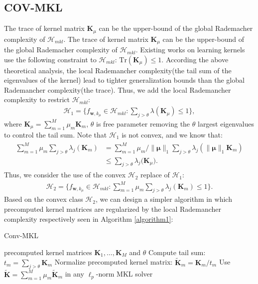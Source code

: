 \documentclass{article}
\begin{document}
\subsection{COV-MKL}
The trace of kernel matrix $\mathbf{K}_\mu$ can be the upper-bound of the global Rademacher complexity of $\mathcal{H}_{mkl}$.
The trace of kernel matrix $\mathbf{K}_\mu$ can be the upper-bound of the global Rademacher complexity of $\mathcal{H}_{mkl}$. Existing works on learning kernels \cite{LanckrietCBGJ02,BachLJ04,SonnenburgRSS06} use the following constraint to $\mathcal{H}_{mkl}$:
$\mathrm{Tr}(\mathbf{K}_\mu) \leq 1.$
According the above theoretical analysis, the local Rademancher complexity(the tail sum of the eigenvalues of the kernel) lead to tighter generalization bounds than the global Rademancher complexity(the trace). Thus, we add the local Rademancher complexity to restrict $\mathcal{H}_{mkl}$:
\begin{align}
    \mathcal{H}_{1}=\Big\{f_{\mathbf{w}, k_\mu} \in \mathcal{H}_{mkl}:\sum_{j > \theta} \lambda(\mathbf{K}_\mu) \leq 1\Big\},
\end{align}
where $\mathbf{K}_\mu=\sum_{m=1}^M \mu_m \mathbf{K}_m$,
$\theta$ is free parameter removing the $\theta$ largest eigenvalues to control the tail sum.
Note that $\mathcal{H}_{1}$ is not convex, and we know that:
\begin{align*}
    \begin{aligned}
        \sum_{m=1}^M\mu_m\sum_{j>\theta}\lambda_{j}(\mathbf{K}_m) & =\sum_{m=1}^M\mu_m/\|\mathbf{\mu}\|_1 \sum_{j>\theta}\lambda_{j}(\|\mathbf{\mu}\|_1\mathbf{K}_m)\\
        & \leq \sum_{j>\theta} \lambda_j\big(\mathbf{K}_\mu\big).
    \end{aligned}
\end{align*}
Thus, we consider the use of the convex $\mathcal{H}_2$ replace of $\mathcal{H}_1$:
\begin{align}
    \mathcal{H}_{2}=\Big\{f_{\mathbf{w}, k_\mu} \in \mathcal{H}_{mkl}:
    \sum_{m=1}^M\mu_m\sum_{j>\theta}\lambda_{j}(\mathbf{K}_m) \leq 1\Big\}.
\end{align}
Based on the convex class $\mathcal{H}_2$, we can design a simpler algorithm in which precomputed kernel matrices
are regularized by the local Rademancher complexity respectively seen in Algorithm  \ref{algorithm1}:
\begin{algorithm}[h]
   \caption{Conv-MKL}
   \label{algorithm1}
    \begin{algorithmic}
        precomputed kernel matrices $\mathbf{K}_1,\ldots,\mathbf{K}_M$ and $\theta$
        \STATE Compute tail sum: $t_m=\sum_{j>\theta}\mathbf{K}_m$
        \STATE Normalize precomputed kernel matrix: $\widetilde{\mathbf{K}}_m=\mathbf{K}_m/t_m$
       \ENDFOR
       \STATE Use $\widetilde{\mathbf{K}}=\sum_{m=1}^M \mu_m \widetilde{\mathbf{K}}_m$ in any $\ell_p$-norm MKL solver
    \end{algorithmic}
\end{algorithm}
\end{document}
